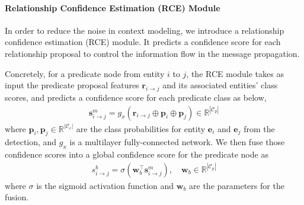 
\vspace{-4mm}
\paragraph{Relationship Confidence Estimation (RCE) Module}\label{subsubsec:rce}
In order to reduce the noise in context modeling, we introduce a relationship confidence estimation (RCE) module. It predicts a confidence score for each relationship proposal to control the information flow in the message propagation.  

Concretely, for a predicate node from entity $i$ to $j$, the RCE module takes as input the predicate proposal features $\mathbf{r}_{i\to  j}$ and its associated entities' class scores, and predicts a confidence score for each predicate class as below, 
\begin{align}
\mathbf{s}^m_{i\to  j}=g_x(\mathbf{r}_{i\to  j}\oplus\mathbf{p}_i\oplus \mathbf{p}_j)\in\mathbb{R}^{|\mathcal{C}_p|}
\end{align}
where $\mathbf{p}_i,\mathbf{p}_j\in \mathbb{R}^{|\mathcal{C}_e|}$ are the class probabilities for entity $\mathbf{e}_i$ and $\mathbf{e}_j$ from the detection, and $ g_x$ is a multilayer fully-connected network. 
We then fuse those confidence scores into a global confidence score for the predicate node as
\begin{align}
s^b_{i\to  j}= \sigma (\mathbf{w}_b^\intercal\mathbf{s}^m_{i\to  j}), \quad \mathbf{w}_b\in\mathbb{R}^{|\mathcal{C}_p|}
\end{align}
where $\sigma$ is the sigmoid activation function and $\mathbf{w}_b$ are the parameters for the fusion. 


